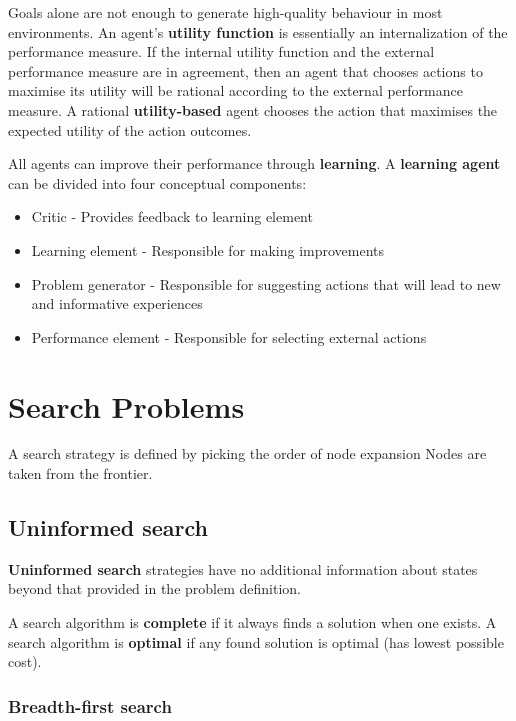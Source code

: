 \documentclass{article}
\begin{document}
Goals alone are not enough to generate high-quality behaviour in most environments. An agent's \textbf{utility function} is essentially an internalization of the performance measure. If the internal utility function and the external performance measure are in agreement, then an agent that chooses actions to maximise its utility will be rational according to the external performance measure. A rational \textbf{utility-based} agent chooses the action that maximises the expected utility of the action outcomes. \newline

All agents can improve their performance through \textbf{learning}. A \textbf{learning agent} can be divided into four conceptual components:
\begin{itemize}
    \item Critic - Provides feedback to learning element
    \item Learning element - Responsible for making improvements
    \item Problem generator - Responsible for suggesting actions that will lead to new and informative experiences
    \item Performance element - Responsible for selecting external actions
\end{itemize}

\section{Search Problems}

A search strategy is defined by picking the order of node expansion
Nodes are taken from the frontier. 

\subsection{Uninformed search}



\textbf{Uninformed search} strategies have no additional information about states beyond that provided in the problem definition. 

A search algorithm is \textbf{complete} if it always finds a solution when one exists. A search algorithm is \textbf{optimal} if any found solution is optimal (has lowest possible cost).


\subsubsection{Breadth-first search}
\end{document}
